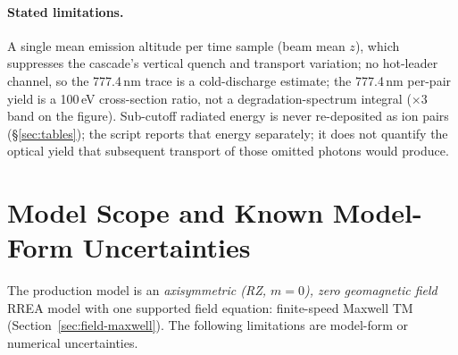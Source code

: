 \documentclass[11pt]{article}
\begin{document}
\paragraph{Stated limitations.} A single mean emission
altitude per time sample (beam mean $z$), which suppresses the cascade's
vertical quench and transport variation; no hot-leader
channel, so the 777.4\,nm trace is a cold-discharge estimate; the
777.4\,nm per-pair yield is a 100\,eV cross-section ratio, not a
degradation-spectrum integral ($\times 3$ band on the figure).  Sub-cutoff
radiated energy is never re-deposited as ion pairs (\S\ref{sec:tables}); the
script reports that energy separately; it does not quantify the optical yield
that subsequent transport of those omitted photons would produce.
\section{Model Scope and Known Model-Form Uncertainties}
\label{sec:model-scope}

The production model is an \emph{axisymmetric (RZ, $m=0$), zero
geomagnetic field} RREA model with one supported field equation: finite-speed
Maxwell TM (Section~\ref{sec:field-maxwell}). The following limitations are
model-form or numerical uncertainties.
\end{document}
